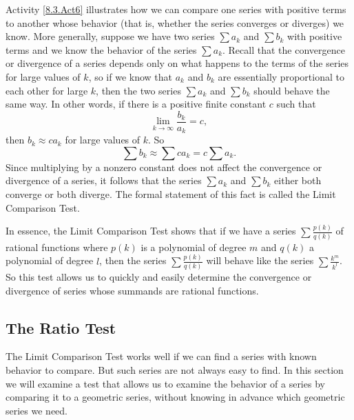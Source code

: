 

Activity \ref{8.3.Act6} illustrates how we can compare one series with positive terms to another whose behavior (that is, whether the series converges or diverges) we know. More generally, suppose we have two series $\sum a_k$ and $\sum b_k$ with positive terms and we know the behavior of the series $\sum a_k$. Recall that the convergence or divergence of a series depends only on what happens to the terms of the series for large values of $k$, so if we know that $a_k$ and $b_k$ are essentially proportional to each other for large $k$, then the two series $\sum a_k$ and $\sum b_k$
should behave the same way. In other words, if there is a positive finite constant $c$ such that
\[\lim_{k \to \infty} \frac{b_k}{a_k} = c,\]
then $b_k \approx ca_k$ for large values of $k$. So
\[\sum b_k \approx \sum ca_k = c  \sum a_k.\]
Since multiplying by a nonzero constant does not affect the convergence or divergence of a series, it follows that the series $\sum a_k$ and $\sum b_k$ either both converge or both diverge. The formal statement of this fact is called the Limit Comparison Test.


\vspace*{5pt}
\nin {}
\vspace*{1pt}

In essence, the Limit Comparison Test shows that if we have a series $\sum \frac{p(k)}{q(k)}$ of rational functions where $p(k)$ is a polynomial of degree $m$ and $q(k)$ a polynomial of degree $l$, then the series $\sum \frac{p(k)}{q(k)}$ will behave like the series $\sum \frac{k^m}{k^l}$. So this test allows us to quickly and easily determine the convergence or divergence of series whose summands are rational functions.




\subsection*{The Ratio Test} 
The Limit Comparison Test works well if we can find a series with known behavior to compare. But such series are not always easy to find. In this section we will examine a test that allows us to examine the behavior of a series by comparing it to a geometric series, without knowing in advance which geometric series we need.

